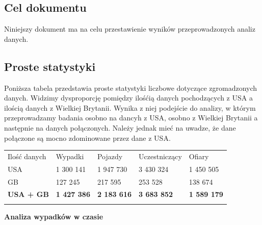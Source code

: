 \subsection{Cel dokumentu}\label{cel-dokumentu}

Niniejszy dokument ma na celu przestawienie wyników przeprowadzonych
analiz danych.

\subsection{Proste statystyki}\label{proste-statystyki}

Poniższa tabela przedstawia proste statystyki liczbowe dotyczące
zgromadzonych danych. Widzimy dysproporcję pomiędzy ilośćią danych
pochodzących z USA a ilością danych z Wielkiej Brytanii. Wynika z niej
podejście do analizy, w którym przeprowadzamy badania osobno na dancyh z
USA, osobno z Wielkiej Brytanii a następnie na danych połączonych.
Należy jednak mieć na uwadze, że dane połączone są mocno zdominowane
przez dane z USA.

\begin{longtable}[c]{@{}lllll@{}}
\toprule\addlinespace
Ilość danych & Wypadki & Pojazdy & Uczestniczący & Ofiary
\\\addlinespace
\midrule\endhead
USA & 1 300 141 & 1 947 730 & 3 430 324 & 1 450 505
\\\addlinespace
GB & 127 245 & 217 595 & 253 528 & 138 674
\\\addlinespace
\textbf{USA + GB} & \textbf{1 427 386} & \textbf{2 183 616} & \textbf{3
683 852} & \textbf{1 589 179}
\\\addlinespace
\bottomrule
\end{longtable}

\textbf{Analiza wypadków w czasie}

